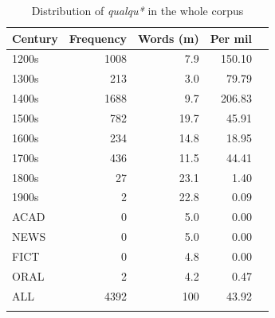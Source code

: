 \begin{table}
\caption{Distribution of \textit{qualqu*} in the whole corpus}
\label{tab:extracted1}

\begin{tabular}{lrrrr}
\lsptoprule
Century &  Frequency &  Words (m) &  Per mil\\
\midrule
1200s &  1008 &  7.9 &  150.10 \\
1300s &  213 &  3.0 &  79.79 \\
1400s &  1688 &  9.7 &  206.83 \\
1500s &  782 &  19.7 &  45.91 \\
1600s &  234 &  14.8 &  18.95 \\
1700s &  436 &  11.5 &  44.41\\
1800s &  27 &  23.1 &  1.40 \\
1900s &  2 &  22.8 &  0.09 \\
\tablevspace
ACAD &  0 &  5.0 &  0.00 \\
NEWS &  0 &  5.0 &  0.00 \\
FICT &  0 &  4.8 &  0.00 \\
ORAL  &  2     &  4.2   &  0.47 \\
\midrule
 {ALL} &  4392 &  100 &  43.92 \\
\lspbottomrule
\end{tabular}
\end{table}


